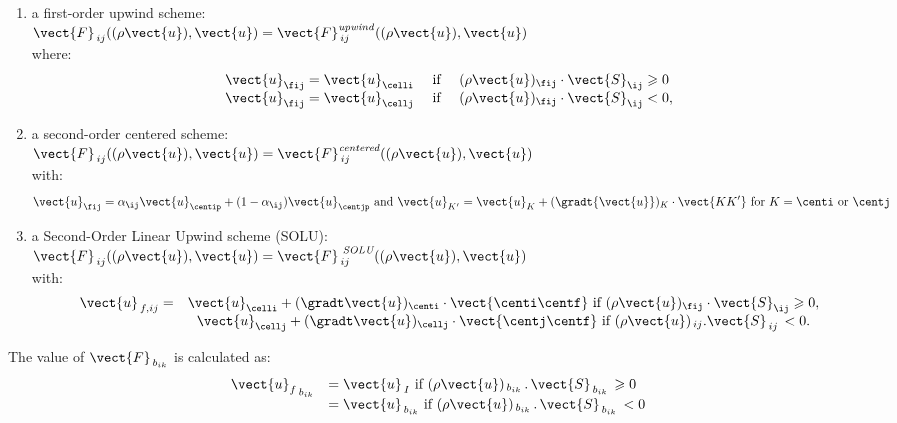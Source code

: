 \begin{enumerate}[ label=\roman{*}/, ref=(\roman{*})]
\item a  first-order upwind scheme:\\
 $\vect{F}_{\,ij}((\rho \vect{u}), \vect{u})=
\vect{F}^{\it{ upwind}}_{\,ij}((\rho \vect{u}),\vect{u})$\\
where:
\begin{equation}
\begin{array}{r c l}
\vect{u}_{\fij}=\vect{u}_{\celli} &\text{ if }&
(\rho \vect{u})_{\fij} \cdot \vect{S}_{\ij} \geqslant 0\\
\vect{u}_{\fij}=\vect{u}_{\cellj} &\text{ if }&
(\rho \vect{u})_{\fij} \cdot \vect{S}_{\ij}  < 0,\\
\end{array}
\end{equation}
%
\item a second-order centered scheme:\\
$\vect{F}_{\,ij}((\rho \vect{u}), \vect{u})=
\vect{F}^{\text{\it{centered}}}_{\,ij}((\rho\vect{u}),\vect{u})$\\
with:
\begin{equation}
\vect{u}_{\fij}=
\alpha_{\ij} \vect{u}_{\centip}+(1-\alpha_{\ij}) \vect{u}_{\centjp} \text{ and } \vect{u}_{K'} = \vect{u}_{K}+(\gradt{\vect{u}})_K \cdot \vect{KK'} \text{ for } K = \centi \text{ or } \centj
\end{equation}
%
\item a Second-Order Linear Upwind scheme (SOLU):\\
$\vect{F}_{\,ij}((\rho \vect{u}), \vect{u})=
\vect{F}^{\text{\it { SOLU}}}_{\,ij}((\rho \vect{u}),\vect{u})$ \\
with:
\begin{equation}
\begin{array}{r c l}
\vect{u}_{\,f,ij}= &
\vect{u}_{\celli} +  (\gradt\vect{u})_{\centi} \cdot \vect{\centi \centf} \text{ if } (\rho
\vect{u})_{\fij} \cdot \vect{S}_{\ij} \geqslant 0, \\
& \vect{u}_{\cellj} + (\gradt \vect{u})_{\cellj} \cdot \vect{\centj \centf} \text{ if } (\rho
\vect{u})_{\,ij}.\vect{S}_{\,ij}\,< 0.
\end{array}
\end{equation}
\end{enumerate}


The value of ${\vect{F}_{\,b_{ik}}}$ is calculated as:\\
\begin{equation}
\begin{array}{ll}
{\vect{u}_f}_{\,{b}_{ik}} &=\vect{u}_{\,I}
\ \text{if $(\rho \vect{u})_{\,{b}_{ik}}\,.\,\vect{S}_{\,{b}_{ik}}\,\geqslant 0$}\\
&={\vect{u}_{\,{b}_{ik}}}
\  \text{if $(\rho \vect{u})_{\,{b}_{ik}}\,.\, \vect{S}_{\,{b}_{ik}}\,< 0$}
\end{array}
\end{equation}

